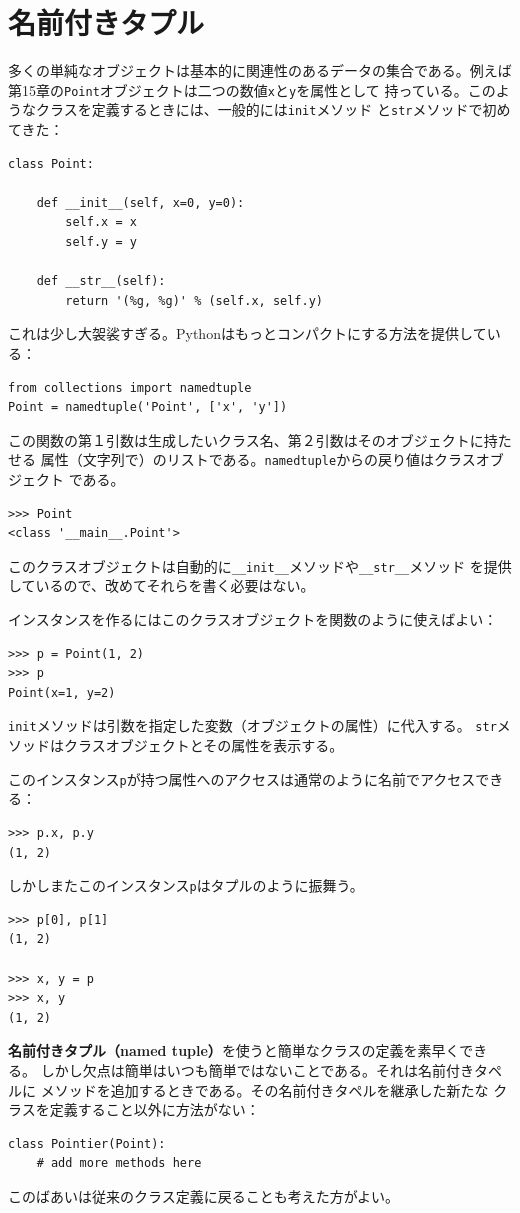 \documentclass[a4j,12pt,makeidx]{jbook}
\begin{document}
\section{名前付きタプル}
多くの単純なオブジェクトは基本的に関連性のあるデータの集合である。例えば
第15章の{\tt Point}オブジェクトは二つの数値{\tt x}と{\tt y}を属性として
持っている。このようなクラスを定義するときには、一般的には{\tt init}メソッド
と{\tt str}メソッドで初めてきた：
\begin{verbatim}
class Point:

    def __init__(self, x=0, y=0):
        self.x = x
        self.y = y

    def __str__(self):
        return '(%g, %g)' % (self.x, self.y)
\end{verbatim}
これは少し大袈裟すぎる。Pythonはもっとコンパクトにする方法を提供している：
\begin{verbatim}
from collections import namedtuple
Point = namedtuple('Point', ['x', 'y'])
\end{verbatim}
この関数の第１引数は生成したいクラス名、第２引数はそのオブジェクトに持たせる
属性（文字列で）のリストである。{\tt namedtuple}からの戻り値はクラスオブジェクト
である。
\begin{verbatim}
>>> Point
<class '__main__.Point'>
\end{verbatim}
このクラスオブジェクトは自動的に{\verb"__init__"}メソッドや{\verb"__str__"}メソッド
を提供しているので、改めてそれらを書く必要はない。\par
インスタンスを作るにはこのクラスオブジェクトを関数のように使えばよい：
\begin{verbatim}
>>> p = Point(1, 2)
>>> p
Point(x=1, y=2)
\end{verbatim}
{\tt init}メソッドは引数を指定した変数（オブジェクトの属性）に代入する。
{\tt str}メソッドはクラスオブジェクトとその属性を表示する。\par
このインスタンス{\tt p}が持つ属性へのアクセスは通常のように名前でアクセスできる：
\begin{verbatim}
>>> p.x, p.y
(1, 2)
\end{verbatim}
しかしまたこのインスタンス{\tt p}はタプルのように振舞う。
\begin{verbatim}
>>> p[0], p[1]
(1, 2)

>>> x, y = p
>>> x, y
(1, 2)
\end{verbatim}
{\bf 名前付きタプル（named tuple）}を使うと簡単なクラスの定義を素早くできる。
しかし欠点は簡単はいつも簡単ではないことである。それは名前付きタペルに
メソッドを追加するときである。その名前付きタペルを継承した新たな
クラスを定義すること以外に方法がない：
\begin{verbatim}
class Pointier(Point):
    # add more methods here
\end{verbatim}
このばあいは従来のクラス定義に戻ることも考えた方がよい。
%
\end{document}
